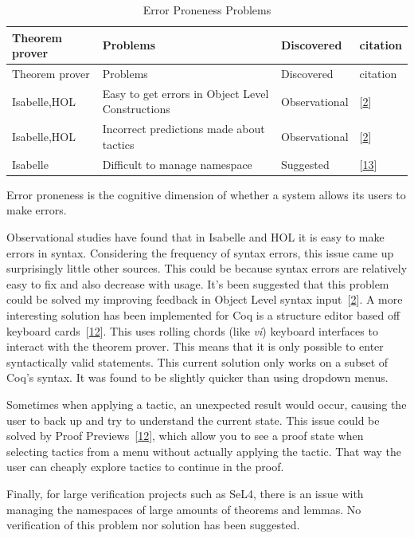 \documentclass[
]{article}
\begin{document}
\hypertarget{tbl:error_proneness}{}
\begin{longtable}[]{@{}llll@{}}
\caption{\label{tbl:error_proneness}Error Proneness
Problems}\tabularnewline
\toprule
Theorem prover & Problems & Discovered & citation \\
\midrule
\endfirsthead
\toprule
Theorem prover & Problems & Discovered & citation \\
\midrule
\endhead
Isabelle,HOL & Easy to get errors in Object Level Constructions &
Observational & {[}\protect\hyperlink{ref-aitken_analysis_2000}{2}{]} \\
Isabelle,HOL & Incorrect predictions made about tactics & Observational
& {[}\protect\hyperlink{ref-aitken_analysis_2000}{2}{]} \\
Isabelle & Difficult to manage namespace & Suggested &
{[}\protect\hyperlink{ref-bourke_challenges_2012}{13}{]} \\
\bottomrule
\end{longtable}

Error proneness is the cognitive dimension of whether a system allows
its users to make errors.

Observational studies have found that in Isabelle and HOL it is easy to
make errors in syntax. Considering the frequency of syntax errors, this
issue came up surprisingly little other sources. This could be because
syntax errors are relatively easy to fix and also decrease with usage.
It's been suggested that this problem could be solved my improving
feedback in Object Level syntax
input~{[}\protect\hyperlink{ref-aitken_analysis_2000}{2}{]}. A more
interesting solution has been implemented for Coq is a structure editor
based off keyboard
cards~{[}\protect\hyperlink{ref-berman_development_2014}{12}{]}. This
uses rolling chords (like \emph{vi}) keyboard interfaces to interact
with the theorem prover. This means that it is only possible to enter
syntactically valid statements. This current solution only works on a
subset of Coq's syntax. It was found to be slightly quicker than using
dropdown menus.

Sometimes when applying a tactic, an unexpected result would occur,
causing the user to back up and try to understand the current state.
This issue could be solved by Proof
Previews~{[}\protect\hyperlink{ref-berman_development_2014}{12}{]},
which allow you to see a proof state when selecting tactics from a menu
without actually applying the tactic. That way the user can cheaply
explore tactics to continue in the proof.

Finally, for large verification projects such as SeL4, there is an issue
with managing the namespaces of large amounts of theorems and lemmas. No
verification of this problem nor solution has been suggested.
\end{document}
